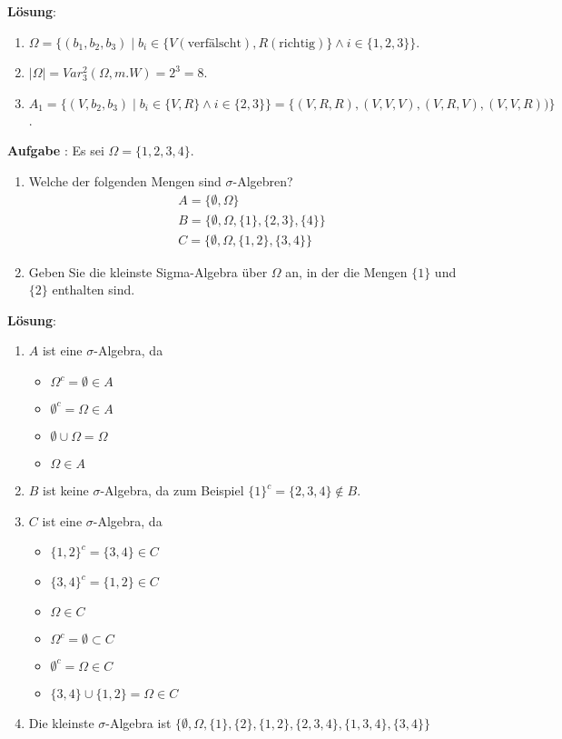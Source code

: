 \documentclass[a4paper,13pt]{scrartcl}
\newcommand{\exercise}{\vspace*{0.2cm}
\stepcounter{aufgabe}
\noindent
\textbf{Aufgabe \arabic{aufgabe}}: }
\newcounter{aufgabe}
\newcommand{\solution}{\vspace*{0.2cm}
\noindent
\textbf{Lösung}: }
\begin{document}
\solution
\begin{enumerate}[label=(\alph*)]
\item $\Omega = \{ (b_1, b_2, b_3) \; | \;  b_i \in \{ V (\text{verfälscht}), R (\text{richtig}) \} \land i \in \{1,2,3\} \}$.
\item $| \Omega | = Var_3^2(\Omega, m.W) =  2^3 = 8$.
\item $A_1 = \{ (V, b_2, b_3) \; | \;  b_i \in \{ V,R  \}  \land i \in \{2,3\} \} = \{ (V,R,R), (V,V,V), (V,R,V), (V,V,R) ) \}$.
\end{enumerate}
\vspace{8mm}


\exercise
Es sei $\Omega = \{ 1,2,3,4\}$. 
\begin{enumerate}[label=(\alph*)]
\item Welche der folgenden Mengen sind $\sigma$-Algebren?
\begin{align*}
& A =  \{ \emptyset,  \Omega  \} \\
& B=  \{ \emptyset,  \Omega , \{ 1\}, \{ 2,3\}, \{ 4\} \}  \\
& C=  \{ \emptyset,  \Omega ,  \{ 1,2\}, \{ 3, 4\} \}  
\end{align*}
\item Geben Sie die kleinste Sigma-Algebra über $\Omega$ an, in der die Mengen $ \{ 1\}$ und $ \{ 2\}$ enthalten sind.
\end{enumerate}
\vspace{8mm}

\solution
\begin{enumerate}[label=(\alph*)]
\item $A$ ist eine $\sigma$-Algebra, da 
\begin{itemize}
\item $\Omega^c =  \emptyset \in A$
\item $\emptyset^c = \Omega \in A$
\item $\emptyset \cup \Omega = \Omega$
\item $\Omega \in A$
\end{itemize}
\item $B$ ist keine $\sigma$-Algebra, da zum Beispiel $\{ 1 \}^c = \{ 2,3,4 \} \notin B$.
\item $C$ ist eine   $\sigma$-Algebra, da 
\begin{itemize}
\item $\{ 1,2 \}^c = \{ 3,4 \} \in C$
\item $\{ 3,4 \}^c = \{ 1,2 \} \in C$
\item $\Omega \in C$
\item $ \Omega^c =  \emptyset \subset C$
\item $\emptyset^c = \Omega \in C$
\item $\{ 3,4 \} \cup\{ 1,2 \} = \Omega \in C$
\end{itemize}
\item Die kleinste $\sigma$-Algebra ist $  \{ \emptyset,  \Omega , \{ 1\}, \{ 2\}, \{ 1, 2\},  \{ 2,3,4\}, \{1, 3, 4\}, \{ 3,4\} \} $
\end{enumerate}
\vspace{8mm}
\end{document}
